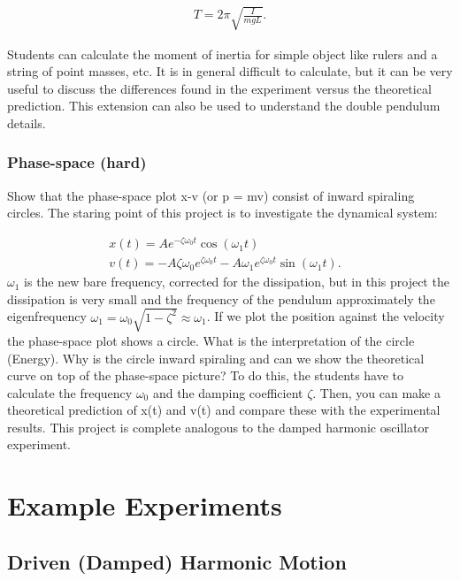 \documentclass{article}
\begin{document}
\begin{align}
    T = 2\pi\sqrt{\frac{I}{mgL}}.
\end{align}

Students can calculate the moment of inertia for simple object like rulers and a string of point masses, etc. It is in general difficult to calculate, but it can be very useful to discuss the differences found in the experiment versus the theoretical prediction. This extension can also be used to understand the double pendulum details.

\subsubsection{Phase-space (hard)}    
Show that the phase-space plot x-v (or p = mv) consist of inward spiraling circles. The staring point of this project is to investigate the dynamical system:

\begin{align}
    x(t) = Ae^{-\zeta\omega_0t}\cos(\omega_1 t) & \\
    v(t) = -A \zeta \omega_0 e^{\zeta \omega_0 t} - A \omega_1e^{\zeta \omega_0 t}\sin(\omega_1 t).
\end{align}
$\omega_1$ is the new bare frequency, corrected for the dissipation, but in this project the dissipation is very small and the frequency of the pendulum approximately the eigenfrequency $\omega_1 =\omega_0\sqrt{1-\zeta^2}\approx \omega_1$. 
If we plot the position against the velocity the phase-space plot shows a circle. What is the interpretation of the circle (Energy). Why is the circle inward spiraling and can we show the theoretical curve on top of the phase-space picture? To do this, the students have to calculate the frequency $\omega_0$ and the damping coefficient $\zeta$. Then, you can make a theoretical prediction of x(t) and v(t) and compare these with the experimental results. This project is complete analogous to the damped harmonic oscillator experiment.

\newpage

\section{Example Experiments}

\subsection{Driven (Damped) Harmonic Motion}
\end{document}
